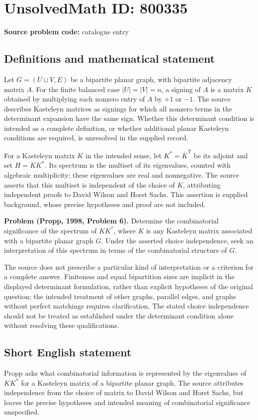 \documentclass[11pt]{article}
\begin{document}
\section*{UnsolvedMath ID: 800335}
\textbf{Source problem code:} catalogue entry
\subsection{Definitions and mathematical statement}
Let \(G=(U\sqcup V,E)\) be a bipartite planar graph, with bipartite adjacency matrix \(A\). For the finite balanced case \(|U|=|V|=n\), a signing of \(A\) is a matrix \(K\) obtained by multiplying each nonzero entry of \(A\) by \(+1\) or \(-1\). The source describes Kasteleyn matrices as signings for which all nonzero terms in the determinant expansion have the same sign. Whether this determinant condition is intended as a complete definition, or whether additional planar Kasteleyn conditions are required, is unresolved in the supplied record.

For a Kasteleyn matrix \(K\) in the intended sense, let \(K^*=\overline{K}^{\mathsf T}\) be its adjoint and set \(H=KK^*\). Its spectrum is the multiset of its eigenvalues, counted with algebraic multiplicity; these eigenvalues are real and nonnegative. The source asserts that this multiset is independent of the choice of \(K\), attributing independent proofs to David Wilson and Horst Sachs. This assertion is supplied background, whose precise hypotheses and proof are not included.

\textbf{Problem (Propp, 1998, Problem 6).} Determine the combinatorial significance of the spectrum of \(KK^*\), where \(K\) is any Kasteleyn matrix associated with a bipartite planar graph \(G\). Under the asserted choice independence, seek an interpretation of this spectrum in terms of the combinatorial structure of \(G\).

The source does not prescribe a particular kind of interpretation or a criterion for a complete answer. Finiteness and equal bipartition sizes are implicit in the displayed determinant formulation, rather than explicit hypotheses of the original question; the intended treatment of other graphs, parallel edges, and graphs without perfect matchings requires clarification. The stated choice independence should not be treated as established under the determinant condition alone without resolving these qualifications.
\subsection{Short English statement}
Propp asks what combinatorial information is represented by the eigenvalues of \(KK^*\) for a Kasteleyn matrix of a bipartite planar graph. The source attributes independence from the choice of matrix to David Wilson and Horst Sachs, but leaves the precise hypotheses and intended meaning of combinatorial significance unspecified.
\end{document}
